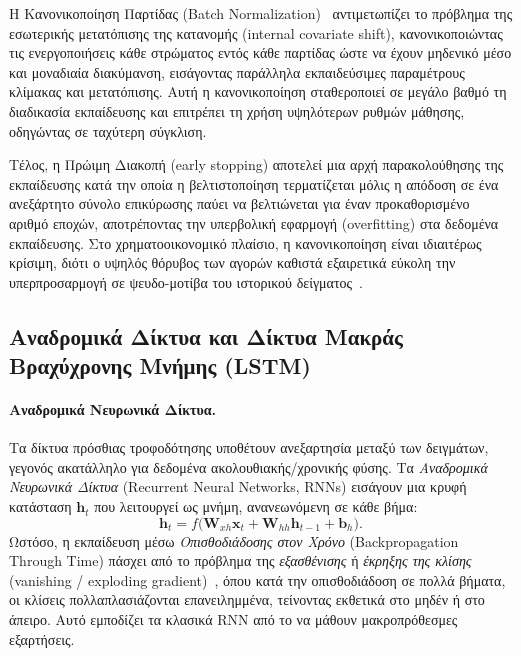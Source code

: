 Η Κανονικοποίηση Παρτίδας (Batch Normalization)~\cite{ioffe2015batchnorm}
αντιμετωπίζει το πρόβλημα της εσωτερικής μετατόπισης της κατανομής
(internal covariate shift), κανονικοποιώντας τις ενεργοποιήσεις κάθε
στρώματος εντός κάθε παρτίδας ώστε να έχουν μηδενικό μέσο και μοναδιαία
διακύμανση, εισάγοντας παράλληλα εκπαιδεύσιμες παραμέτρους κλίμακας και
μετατόπισης. Αυτή η κανονικοποίηση σταθεροποιεί σε μεγάλο βαθμό τη
διαδικασία εκπαίδευσης και επιτρέπει τη χρήση υψηλότερων ρυθμών μάθησης,
οδηγώντας σε ταχύτερη σύγκλιση.

Τέλος, η Πρώιμη Διακοπή (early stopping) αποτελεί μια αρχή παρακολούθησης
της εκπαίδευσης κατά την οποία η βελτιστοποίηση τερματίζεται μόλις η
απόδοση σε ένα ανεξάρτητο σύνολο επικύρωσης παύει να βελτιώνεται για
έναν προκαθορισμένο αριθμό εποχών, αποτρέποντας την υπερβολική εφαρμογή
(overfitting) στα δεδομένα εκπαίδευσης. Στο χρηματοοικονομικό πλαίσιο, η
κανονικοποίηση είναι ιδιαιτέρως κρίσιμη, διότι ο υψηλός θόρυβος των
αγορών καθιστά εξαιρετικά εύκολη την υπερπροσαρμογή σε ψευδο-μοτίβα του
ιστορικού δείγματος~\cite{hambly2023rlfinance}.


\subsection{Αναδρομικά Δίκτυα και Δίκτυα Μακράς Βραχύχρονης Μνήμης (LSTM)}
\label{subsec:lstm}

\paragraph{Αναδρομικά Νευρωνικά Δίκτυα.}
Τα δίκτυα πρόσθιας τροφοδότησης υποθέτουν ανεξαρτησία μεταξύ των δειγμάτων,
γεγονός ακατάλληλο για δεδομένα ακολουθιακής/χρονικής φύσης. Τα
\emph{Αναδρομικά Νευρωνικά Δίκτυα} (Recurrent
Neural Networks, RNNs) εισάγουν μια κρυφή κατάσταση $\mathbf{h}_t$ που
λειτουργεί ως μνήμη, ανανεωνόμενη σε κάθε βήμα:
\begin{equation}
    \mathbf{h}_t = f\!\big(\mathbf{W}_{xh}\mathbf{x}_t
    + \mathbf{W}_{hh}\mathbf{h}_{t-1} + \mathbf{b}_h\big).
    \label{eq:rnn}
\end{equation}
Ωστόσο, η εκπαίδευση μέσω \emph{Οπισθοδιάδοσης στον Χρόνο}
(Backpropagation Through Time) πάσχει από το
πρόβλημα της \emph{εξασθένισης} ή \emph{έκρηξης της κλίσης}
(vanishing / exploding
gradient)~\cite{bengio1994vanishing}, όπου κατά την οπισθοδιάδοση σε πολλά βήματα,
οι κλίσεις πολλαπλασιάζονται επανειλημμένα, τείνοντας εκθετικά στο μηδέν ή στο
άπειρο. Αυτό εμποδίζει τα κλασικά RNN από το να μάθουν μακροπρόθεσμες
εξαρτήσεις.

